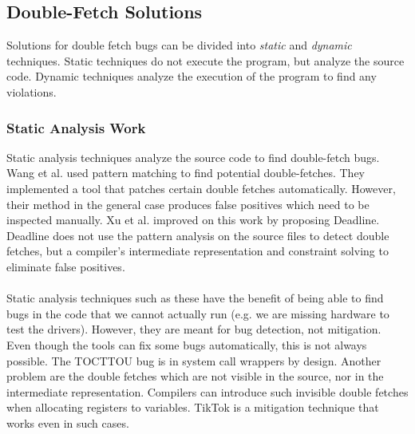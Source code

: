 \subsection{Double-Fetch Solutions}

Solutions for double fetch bugs can be divided into \emph{static} and
\emph{dynamic} techniques. Static techniques do not execute the program, but
analyze the source code. Dynamic techniques analyze the execution of the
program to find any violations.

\subsubsection{Static Analysis Work}
\label{subsec:dfstatic}
Static analysis techniques analyze the source code to find double-fetch bugs.
Wang et al. \cite{wang2017double} used pattern matching to find potential
double-fetches. They implemented a tool that patches certain double fetches
automatically. However, their method in the general case produces false
positives which need to be inspected manually. Xu et al.\cite{xu2018precise}
improved on this work by proposing Deadline. Deadline does not use the pattern 
analysis on the source files to detect double fetches, but a compiler's
intermediate representation and constraint solving to eliminate false positives.
\\
\\
Static analysis techniques such as these have the benefit of being able to find
bugs in the code that we cannot actually run (e.g. we are missing hardware to
test the drivers). However, they are meant for bug detection, not mitigation.
Even though the tools can fix some bugs automatically, this is not always
possible. The TOCTTOU bug is in system call wrappers by design. Another problem
are the double fetches which are not visible in the source, nor in the
intermediate representation. Compilers can introduce such invisible double
fetches when allocating registers to variables. TikTok is a mitigation technique
that works even in such cases.
\\
\\

